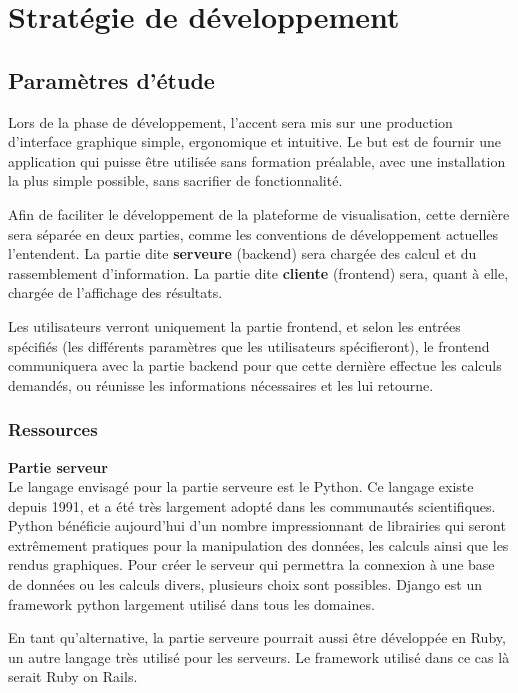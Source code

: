 \section{Stratégie de développement}

\subsection{Paramètres d'étude}

Lors de la phase de développement, l'accent sera mis sur une production d'interface graphique simple, ergonomique et intuitive.
Le but est de fournir une application qui puisse être utilisée sans formation préalable, avec une installation la plus simple possible, sans sacrifier de fonctionnalité.

Afin de faciliter le développement de la plateforme de visualisation, cette dernière sera séparée en deux parties, comme les conventions de développement actuelles l'entendent. 
La partie dite \textbf{serveure} (backend) sera chargée des calcul et du rassemblement d'information. 
La partie dite \textbf{cliente} (frontend) sera, quant à elle, chargée de l'affichage des résultats.

Les utilisateurs verront uniquement la partie frontend, et selon les entrées spécifiés (les différents paramètres que les utilisateurs spécifieront), le frontend communiquera avec la partie backend pour que cette dernière effectue les calculs demandés, ou réunisse les informations nécessaires et les lui retourne.

\subsubsection{Ressources}

\textbf{Partie serveur} \\
Le langage envisagé pour la partie serveure est le Python.
Ce langage existe depuis 1991, et a été très largement adopté dans les communautés scientifiques.
Python bénéficie aujourd'hui d'un nombre impressionnant de librairies qui seront extrêmement pratiques pour la manipulation des données, les calculs ainsi que les rendus graphiques.
Pour créer le serveur qui permettra la connexion à une base de données ou les calculs divers, plusieurs choix sont possibles.
Django est un framework python largement utilisé dans tous les domaines.

En tant qu'alternative, la partie serveure pourrait aussi être développée en Ruby, un autre langage très utilisé pour les serveurs.
Le framework utilisé dans ce cas là serait Ruby on Rails.


